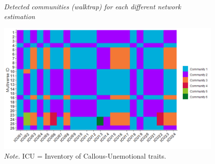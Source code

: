 \documentclass[a4paper,12pt]{article} %
\newcommand{\todo}[1]{\textcolor{red}{TODO: #1}\PackageWarning{TODO:}{#1!}} %
\begin{document}
\begin{figure}[h!]
	\caption{\label{fig:communities}\protect\linebreak[1]\textit{Detected communities (walktrap) for each different network estimation}}
	\includegraphics[width=0.9\linewidth]{../figures/communities.png}
	\caption*{\textit{Note.} ICU = Inventory of Callous-Unemotional traits.}
\end{figure}


%
%




\end{document}
